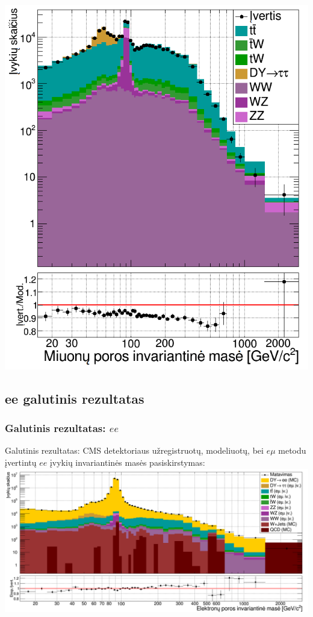 \documentclass[xcolor=dvipsnames]{beamer}
\newcommand{\emu}{\mathit{e}\mu}
\newcommand{\ee}{\mathit{ee}}
\begin{document}
\begin{frame}
\begin{minipage}{0.46\textwidth}
		\includegraphics[width=\linewidth]{mumuMassEst_SMALL.png}
	\end{minipage}
\end{frame}


\begin{frame}
	\section{ee galutinis rezultatas}
	\frametitle{Galutinis rezultatas: $\ee$}
	Galutinis rezultatas: CMS detektoriaus užregistruotų, modeliuotų, bei $\emu$ metodu įvertintų $\ee$ įvykių invariantinės
	masės pasiskirstymas:
	\includegraphics[width=\textwidth]{eeMassFinal_BIG.png}
\end{frame}
\end{document}
